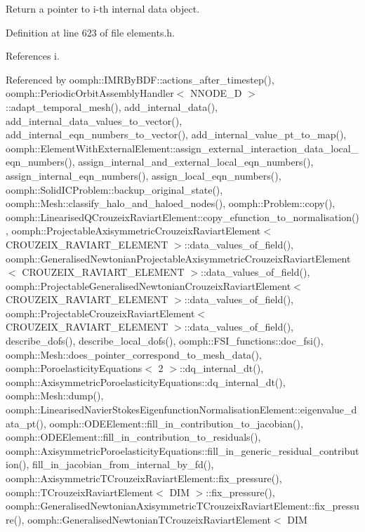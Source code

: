 Return a pointer to i-\/th internal data object. 



Definition at line 623 of file elements.\+h.



References i.



Referenced by oomph\+::\+I\+M\+R\+By\+B\+D\+F\+::actions\+\_\+after\+\_\+timestep(), oomph\+::\+Periodic\+Orbit\+Assembly\+Handler$<$ N\+N\+O\+D\+E\+\_\+D $>$\+::adapt\+\_\+temporal\+\_\+mesh(), add\+\_\+internal\+\_\+data(), add\+\_\+internal\+\_\+data\+\_\+values\+\_\+to\+\_\+vector(), add\+\_\+internal\+\_\+eqn\+\_\+numbers\+\_\+to\+\_\+vector(), add\+\_\+internal\+\_\+value\+\_\+pt\+\_\+to\+\_\+map(), oomph\+::\+Element\+With\+External\+Element\+::assign\+\_\+external\+\_\+interaction\+\_\+data\+\_\+local\+\_\+eqn\+\_\+numbers(), assign\+\_\+internal\+\_\+and\+\_\+external\+\_\+local\+\_\+eqn\+\_\+numbers(), assign\+\_\+internal\+\_\+eqn\+\_\+numbers(), assign\+\_\+local\+\_\+eqn\+\_\+numbers(), oomph\+::\+Solid\+I\+C\+Problem\+::backup\+\_\+original\+\_\+state(), oomph\+::\+Mesh\+::classify\+\_\+halo\+\_\+and\+\_\+haloed\+\_\+nodes(), oomph\+::\+Problem\+::copy(), oomph\+::\+Linearised\+Q\+Crouzeix\+Raviart\+Element\+::copy\+\_\+efunction\+\_\+to\+\_\+normalisation(), oomph\+::\+Projectable\+Axisymmetric\+Crouzeix\+Raviart\+Element$<$ C\+R\+O\+U\+Z\+E\+I\+X\+\_\+\+R\+A\+V\+I\+A\+R\+T\+\_\+\+E\+L\+E\+M\+E\+N\+T $>$\+::data\+\_\+values\+\_\+of\+\_\+field(), oomph\+::\+Generalised\+Newtonian\+Projectable\+Axisymmetric\+Crouzeix\+Raviart\+Element$<$ C\+R\+O\+U\+Z\+E\+I\+X\+\_\+\+R\+A\+V\+I\+A\+R\+T\+\_\+\+E\+L\+E\+M\+E\+N\+T $>$\+::data\+\_\+values\+\_\+of\+\_\+field(), oomph\+::\+Projectable\+Generalised\+Newtonian\+Crouzeix\+Raviart\+Element$<$ C\+R\+O\+U\+Z\+E\+I\+X\+\_\+\+R\+A\+V\+I\+A\+R\+T\+\_\+\+E\+L\+E\+M\+E\+N\+T $>$\+::data\+\_\+values\+\_\+of\+\_\+field(), oomph\+::\+Projectable\+Crouzeix\+Raviart\+Element$<$ C\+R\+O\+U\+Z\+E\+I\+X\+\_\+\+R\+A\+V\+I\+A\+R\+T\+\_\+\+E\+L\+E\+M\+E\+N\+T $>$\+::data\+\_\+values\+\_\+of\+\_\+field(), describe\+\_\+dofs(), describe\+\_\+local\+\_\+dofs(), oomph\+::\+F\+S\+I\+\_\+functions\+::doc\+\_\+fsi(), oomph\+::\+Mesh\+::does\+\_\+pointer\+\_\+correspond\+\_\+to\+\_\+mesh\+\_\+data(), oomph\+::\+Poroelasticity\+Equations$<$ 2 $>$\+::dq\+\_\+internal\+\_\+dt(), oomph\+::\+Axisymmetric\+Poroelasticity\+Equations\+::dq\+\_\+internal\+\_\+dt(), oomph\+::\+Mesh\+::dump(), oomph\+::\+Linearised\+Navier\+Stokes\+Eigenfunction\+Normalisation\+Element\+::eigenvalue\+\_\+data\+\_\+pt(), oomph\+::\+O\+D\+E\+Element\+::fill\+\_\+in\+\_\+contribution\+\_\+to\+\_\+jacobian(), oomph\+::\+O\+D\+E\+Element\+::fill\+\_\+in\+\_\+contribution\+\_\+to\+\_\+residuals(), oomph\+::\+Axisymmetric\+Poroelasticity\+Equations\+::fill\+\_\+in\+\_\+generic\+\_\+residual\+\_\+contribution(), fill\+\_\+in\+\_\+jacobian\+\_\+from\+\_\+internal\+\_\+by\+\_\+fd(), oomph\+::\+Axisymmetric\+T\+Crouzeix\+Raviart\+Element\+::fix\+\_\+pressure(), oomph\+::\+T\+Crouzeix\+Raviart\+Element$<$ D\+I\+M $>$\+::fix\+\_\+pressure(), oomph\+::\+Generalised\+Newtonian\+Axisymmetric\+T\+Crouzeix\+Raviart\+Element\+::fix\+\_\+pressure(), oomph\+::\+Generalised\+Newtonian\+T\+Crouzeix\+Raviart\+Element$<$ D\+I\+M 